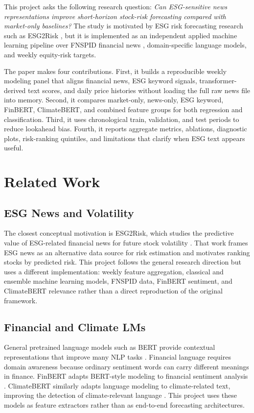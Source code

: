 \documentclass[sigconf,nonacm]{acmart}
\begin{document}
This project asks the following research question: \emph{Can ESG-sensitive news representations improve short-horizon stock-risk forecasting compared with market-only baselines?} The study is motivated by ESG risk forecasting research such as ESG2Risk \cite{guo2020esg2risk}, but it is implemented as an independent applied machine learning pipeline over FNSPID financial news \cite{dong2024fnspid}, domain-specific language models, and weekly equity-risk targets.

The paper makes four contributions. First, it builds a reproducible weekly modeling panel that aligns financial news, ESG keyword signals, transformer-derived text scores, and daily price histories without loading the full raw news file into memory. Second, it compares market-only, news-only, ESG keyword, FinBERT, ClimateBERT, and combined feature groups for both regression and classification. Third, it uses chronological train, validation, and test periods to reduce lookahead bias. Fourth, it reports aggregate metrics, ablations, diagnostic plots, risk-ranking quintiles, and limitations that clarify when ESG text appears useful.

\section{Related Work}
\subsection{ESG News and Volatility}
The closest conceptual motivation is ESG2Risk, which studies the predictive value of ESG-related financial news for future stock volatility \cite{guo2020esg2risk}. That work frames ESG news as an alternative data source for risk estimation and motivates ranking stocks by predicted risk. This project follows the general research direction but uses a different implementation: weekly feature aggregation, classical and ensemble machine learning models, FNSPID data, FinBERT sentiment, and ClimateBERT relevance rather than a direct reproduction of the original framework.

\subsection{Financial and Climate LMs}
General pretrained language models such as BERT provide contextual representations that improve many NLP tasks \cite{devlin2019bert}. Financial language requires domain awareness because ordinary sentiment words can carry different meanings in finance. FinBERT adapts BERT-style modeling to financial sentiment analysis \cite{araci2019finbert}. ClimateBERT similarly adapts language modeling to climate-related text, improving the detection of climate-relevant language \cite{webersinke2022climatebert}. This project uses these models as feature extractors rather than as end-to-end forecasting architectures.
\end{document}
